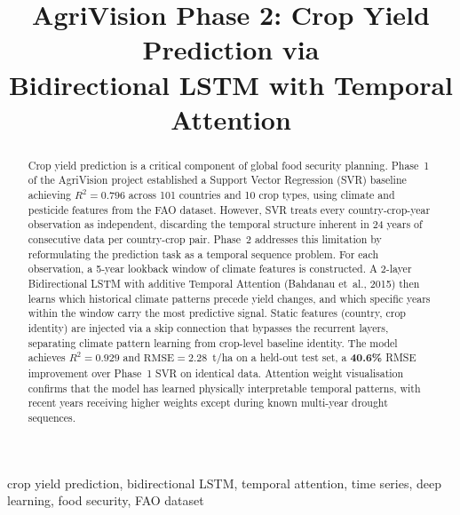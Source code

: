 \documentclass[conference]{IEEEtran}
\begin{document}
\title{AgriVision Phase 2: Crop Yield Prediction via\\
Bidirectional LSTM with Temporal Attention}

\author{
}

\maketitle

\begin{abstract}
Crop yield prediction is a critical component of global food security planning.
Phase~1 of the AgriVision project established a Support Vector Regression (SVR)
baseline achieving $R^{2} = 0.796$ across 101 countries and 10 crop types, using
climate and pesticide features from the FAO dataset.
However, SVR treats every country-crop-year observation as independent, discarding
the temporal structure inherent in 24 years of consecutive data per country-crop pair.
Phase~2 addresses this limitation by reformulating the prediction task as a temporal
sequence problem.
For each observation, a 5-year lookback window of climate features is constructed.
A 2-layer Bidirectional LSTM with additive Temporal Attention (Bahdanau et~al., 2015)
then learns which historical climate patterns precede yield changes, and which specific
years within the window carry the most predictive signal.
Static features (country, crop identity) are injected via a skip connection that
bypasses the recurrent layers, separating climate pattern learning from crop-level
baseline identity.
The model achieves $R^{2} = 0.929$ and $\text{RMSE} = 2.28$~t/ha on a held-out test
set, a \textbf{40.6\%} RMSE improvement over Phase~1 SVR on identical data.
Attention weight visualisation confirms that the model has learned physically
interpretable temporal patterns, with recent years receiving higher weights except
during known multi-year drought sequences.
\end{abstract}

\begin{IEEEkeywords}
crop yield prediction, bidirectional LSTM, temporal attention, time series,
deep learning, food security, FAO dataset
\end{IEEEkeywords}
\end{document}
